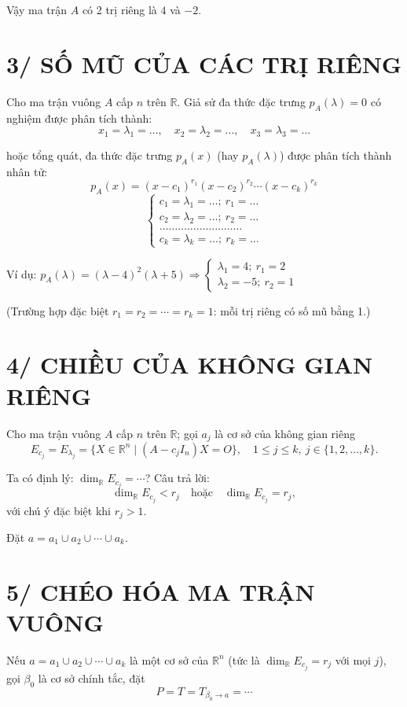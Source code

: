 \documentclass[12pt,a4paper]{article}
\newcommand{\R}{\mathbb{R}}
\begin{document}
Vậy ma trận $A$ có 2 trị riêng là $4$ và $-2$.

\newpage
\section*{3/ SỐ MŨ CỦA CÁC TRỊ RIÊNG}

Cho ma trận vuông $A$ cấp $n$ trên $\R$. Giả sử đa thức đặc trưng $p_A(\lambda)=0$ có nghiệm được phân tích thành:
\[
x_1=\lambda_1=\ldots,\quad x_2=\lambda_2=\ldots,\quad x_3=\lambda_3=\ldots
\]

hoặc tổng quát, đa thức đặc trưng $p_A(x)$ (hay $p_A(\lambda)$) được phân tích thành nhân tử:
\[
p_A(x)=(x-c_1)^{r_1}(x-c_2)^{r_2}\cdots(x-c_k)^{r_k}
\]
\[
\begin{cases}
c_1=\lambda_1=\ldots;\ r_1=\ldots\\
c_2=\lambda_2=\ldots;\ r_2=\ldots\\
\ldots\ldots\ldots\ldots\ldots\ldots\ldots\ldots\ldots\\
c_k=\lambda_k=\ldots;\ r_k=\ldots
\end{cases}
\]

Ví dụ: $p_A(\lambda)=(\lambda-4)^2(\lambda+5)\Rightarrow
\begin{cases}\lambda_1=4;\ r_1=2\\ \lambda_2=-5;\ r_2=1\end{cases}$

\medskip
\noindent(Trường hợp đặc biệt $r_1=r_2=\cdots=r_k=1$: mỗi trị riêng có số mũ bằng 1.)

\newpage
\section*{4/ CHIỀU CỦA KHÔNG GIAN RIÊNG}

Cho ma trận vuông $A$ cấp $n$ trên $\R$; gọi $a_j$ là cơ sở của không gian riêng
\[
E_{c_j}=E_{\lambda_j}=\{X\in\R^n \mid (A-c_jI_n)X=O\},\quad 1\le j\le k,\ j\in\{1,2,\ldots,k\}.
\]

Ta có định lý: $\dim_\R E_{c_j}=\cdots$? Câu trả lời:
\[
\dim_\R E_{c_j}<r_j \quad\text{hoặc}\quad \dim_\R E_{c_j}=r_j,
\]
với chú ý đặc biệt khi $r_j>1$.

Đặt $a=a_1\cup a_2\cup\cdots\cup a_k$.

\newpage
\section*{5/ CHÉO HÓA MA TRẬN VUÔNG}

Nếu $a=a_1\cup a_2\cup\cdots\cup a_k$ là một cơ sở của $\R^n$ (tức là $\dim_\R E_{c_j}=r_j$ với mọi $j$), gọi $\beta_0$ là cơ sở chính tắc, đặt
\[
P=T=T_{\beta_0\to a}=\cdots
\]
\end{document}
